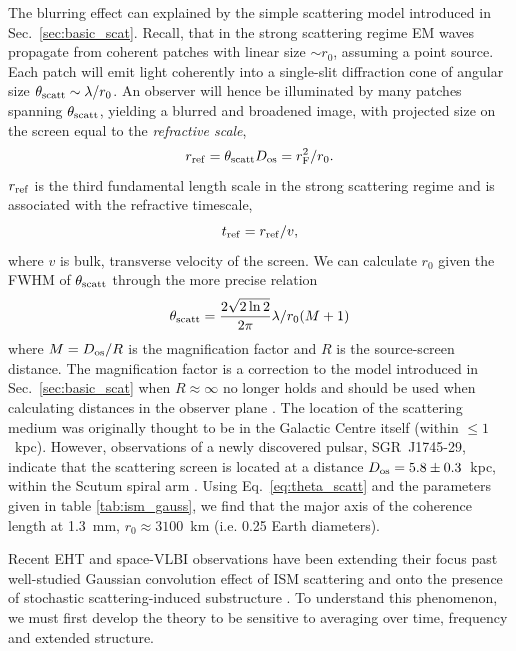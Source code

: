 The blurring effect can explained by the simple scattering model introduced in  Sec.~\ref{sec:basic_scat}. Recall, that in the strong scattering regime EM waves propagate from coherent patches with linear size $\sim r_0$, assuming a point source. Each patch will emit light coherently into a single-slit diffraction cone of angular size $\theta_{\rm scatt} \sim \lambda /r_0$. An observer will hence be illuminated by many patches spanning $\theta_{\rm scatt}$, yielding a blurred and broadened image, with projected size on the screen equal to the \emph{refractive scale},
\begin{equation}
r_{\rm ref} = \theta_{\rm scatt} D_{\rm os} = r_{\rm F}^2/r_0.
\end{equation}
$r_{\rm ref}$ is the third fundamental length scale in the strong scattering regime and is associated with the refractive timescale,
\begin{equation}
t_{\rm ref} = r_{\rm ref}/v,
\end{equation}
where $v$ is bulk, transverse velocity of the screen.
We can calculate $r_0$ given the FWHM of $\theta_{\rm scatt}$ through the more precise relation
\begin{equation}\label{eq:theta_scatt}
 \theta_{\rm scatt} = \frac{2\sqrt{2\ln{2}}}{2\pi} \lambda / r_0 (M+1)
\end{equation} 
where $M = D_{\rm os}/R$ is the magnification factor and $R$ is the source-screen distance. The magnification factor is a correction to the model introduced in Sec.~\ref{sec:basic_scat} when $R \approx \infty$ no longer holds and should be used when calculating distances in the observer plane \citep*{Goodman_1989}.
The location of the scattering medium was originally thought to be in the Galactic Centre itself (within $\le 1$~kpc). However, observations of a newly discovered pulsar, SGR~J1745-29, indicate that the scattering screen is located at a distance $D_{\rm os} = 5.8 \pm 0.3$~kpc, within the Scutum spiral arm \citep{Bower_2014}. Using Eq.~\ref{eq:theta_scatt} and the parameters given in table \ref{tab:ism_gauss}, we find that the major axis of the coherence length at 1.3~mm, $r_0 \approx 3100$~km (i.e. 0.25 Earth diameters).


Recent EHT and space-VLBI observations have been extending their focus past well-studied Gaussian convolution effect of ISM scattering and onto the presence of stochastic scattering-induced substructure \citep[e.g.][]{Fish_2016, Johnson_2016}. To understand this phenomenon, we must first develop the theory to be sensitive to averaging over time, frequency and extended structure. 

